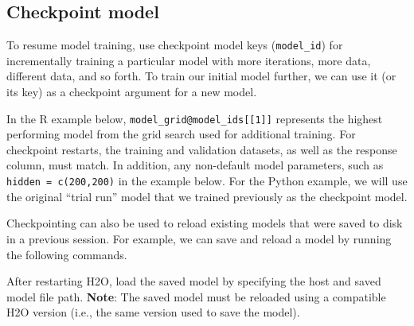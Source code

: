%


\subsection{Checkpoint model}

To resume model training, use checkpoint model keys (\texttt{model\_id}) for incrementally training a particular model with more iterations, more data, different data, and so forth. To train our initial model further, we can use it (or its key) as a checkpoint argument for a new model.

In the R example below, \texttt{model\_grid@model\_ids[[1]]} represents the highest performing model from the grid search used for additional training. For checkpoint restarts, the training and validation datasets, as well as the response column, must match.  In addition, any non-default model parameters, such as \texttt{hidden = c(200,200)} in the example below.  For the Python example, we will use the original ``trial run'' model that we trained previously as the checkpoint model.

\waterExampleInR


\waterExampleInPython


\noindent
Checkpointing can also be used to reload existing models that were saved to disk in a previous session. For example, we can save and reload a model by running the following commands.

\waterExampleInR


\waterExampleInPython



\normalsize

\noindent
After restarting  H2O, load the saved model by specifying the host and saved model file path. \textbf{Note}: The saved model must be reloaded using a compatible H2O version (i.e., the same version used to save the model).

\normalsize
\waterExampleInR


\waterExampleInPython




